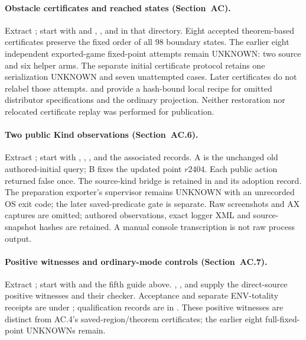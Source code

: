 \paragraph{Obstacle certificates and reached states (Section~AC).}
Extract ; start with  and
,
, and 
in that directory. Eight accepted theorem-based certificates preserve
the fixed order of all 98 boundary states. The earlier eight independent
exported-game fixed-point attempts remain UNKNOWN: two source and six
helper arms. The separate initial certificate protocol retains one
serialization UNKNOWN and seven unattempted cases. Later certificates
do not relabel those attempts.  and
 provide a hash-bound local recipe for omitted
distributor specifications and the ordinary projection. Neither
restoration nor relocated certificate replay was performed for publication.

\paragraph{Two public Kind observations (Section~AC.6).}
Extract ; start with ,
, , and the associated
 records. A is the unchanged old
authored-initial query; B fixes the updated point $r2404$. Each public
action returned false once. The source-kind bridge is retained in
 and its adoption record. The preparation
exporter's supervisor remains UNKNOWN with an unrecorded OS exit code;
the later saved-predicate gate is separate. Raw screenshots and AX captures
are omitted; authored observations, exact logger XML and source-snapshot
hashes are retained. A manual console transcription is not raw process output.

\paragraph{Positive witnesses and ordinary-mode controls (Section~AC.7).}
Extract ; start with
 and the fifth guide above.
, ,
 and
 supply the direct-source
positive witnesses and their checker. Acceptance and separate
ENV-totality receipts are under ; qualification records
are in .
These positive witnesses are distinct from AC.4's saved-region/theorem
certificates; the earlier eight full-fixed-point UNKNOWNs remain.

